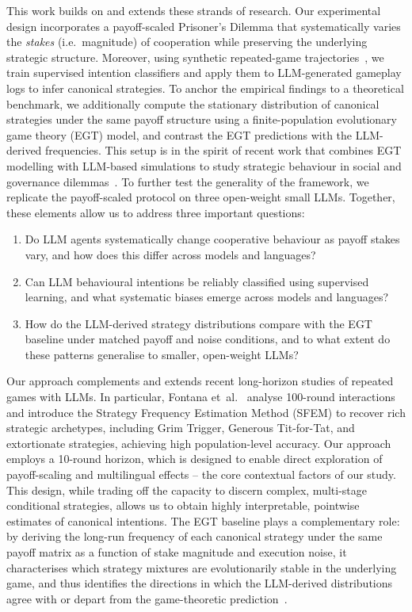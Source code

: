 \documentclass[a4paper,fleqn]{cas-sc}
\begin{document}
This work builds on and extends these strands of research. Our experimental design incorporates a payoff-scaled Prisoner's Dilemma that systematically varies the \emph{stakes} (i.e.\ magnitude) of cooperation while preserving the underlying strategic structure. Moreover, using synthetic repeated-game trajectories~\cite{han2011role}, we train supervised intention classifiers and apply them to LLM-generated gameplay logs to infer canonical strategies. To anchor the empirical findings to a theoretical benchmark, we additionally compute the stationary distribution of canonical strategies under the same payoff structure using a finite-population evolutionary game theory (EGT) model, and contrast the EGT predictions with the LLM-derived frequencies. This setup is in the spirit of recent work that combines EGT modelling with LLM-based simulations to study strategic behaviour in social and governance dilemmas~\cite{balabanova2025media,buscemi2025llms}. To further test the generality of the framework, we replicate the payoff-scaled protocol on three open-weight small LLMs. Together, these elements allow us to address three important questions:
\begin{enumerate}[(1)]
\item Do LLM agents systematically change cooperative behaviour as payoff stakes vary, and how does this differ across models and languages?
\item Can LLM behavioural intentions be reliably classified using supervised learning, and what systematic biases emerge across models and languages?
\item How do the LLM-derived strategy distributions compare with the EGT baseline under matched payoff and noise conditions, and to what extent do these patterns generalise to smaller, open-weight LLMs?
\end{enumerate}

Our approach complements and extends recent long-horizon studies of repeated games with LLMs. In particular, Fontana et~al.~\cite{fontana2025nicer} analyse 100-round interactions and introduce the Strategy Frequency Estimation Method (SFEM) to recover rich strategic archetypes, including Grim Trigger, Generous Tit-for-Tat, and extortionate strategies, achieving high population-level accuracy. Our approach employs a 10-round horizon, which is designed to enable direct exploration of payoff-scaling and multilingual effects -- the core contextual factors of our study. This design, while trading off the capacity to discern complex, multi-stage conditional strategies, allows us to obtain highly interpretable, pointwise estimates of canonical intentions. The EGT baseline plays a complementary role: by deriving the long-run frequency of each canonical strategy under the same payoff matrix as a function of stake magnitude and execution noise, it characterises which strategy mixtures are evolutionarily stable in the underlying game, and thus identifies the directions in which the LLM-derived distributions agree with or depart from the game-theoretic prediction~\cite{balabanova2025media,sigmund:2010bo,han_when_2021}.
\end{document}
